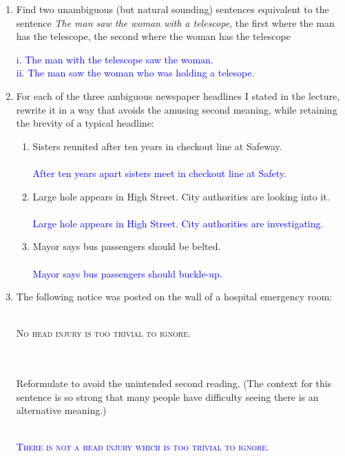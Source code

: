 \documentclass[13.5pt]{article}
\begin{document}
\begin{enumerate}
\item{Find two unambiguous (but natural sounding) sentences equivalent to the sentence \textit{The man saw
the woman with a telescope}, the first where the man has the telescope, the second where the woman
has the telescope}\\

\begin{enumerate} 
  \textcolor{blue}{i. The man with the telescope saw the woman.}\\
  \textcolor{blue}{ii. The man saw the woman who was holding a telesope.} 
\end{enumerate}

\item{For each of the three ambiguous newspaper headlines I stated in the lecture, rewrite it in a way
that avoids the amusing second meaning, while retaining the brevity of a typical headline:
}
\begin{enumerate}
\item{Sisters reunited after ten years in checkout line at Safeway.}\\\\
\textcolor{blue}{After ten years apart sisters meet in checkout line at Safety.}\\
\item{Large hole appears in High Street. City authorities are looking into it.}\\\\
\textcolor{blue}{Large hole appears in High Street. City authorities are investigating.}\\
\item{Mayor says bus passengers should be belted.}\\\\
\textcolor{blue}{Mayor says bus passengers should buckle-up.}\\
\end{enumerate}

\item{The following notice was posted on the wall of a hospital emergency room:}\\\\
\centerline{\textsc{No head injury is too trivial to ignore.}}\\\\
{Reformulate to avoid the unintended second reading. (The context for this sentence is so strong
that many people have difficulty seeing there is an alternative meaning.)}\\\\
\textcolor{blue}{\centerline{\textsc{There is not a head injury which is too trivial to ignore.}}}


\end{enumerate}
\end{document}
